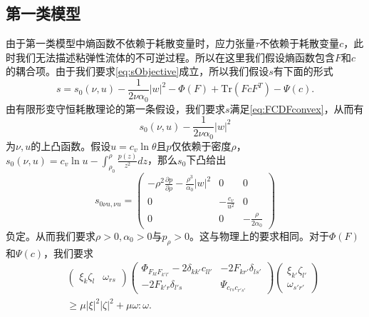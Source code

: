 \documentclass{article}
\begin{document}
\subsection{第一类模型}
由于第一类模型中熵函数不依赖于耗散变量时，应力张量$\tau$不依赖于耗散变量$c$，此时我们无法描述粘弹性流体的不可逆过程。所以在这里我们假设熵函数包含$F$和$c$的耦合项。由于我们要求\eqref{eq:sObjective}成立，所以我们假设$s$有下面的形式 
 $$s = s_0(\nu,u) - \frac{1}{2 \nu \alpha_0} |w|^2 - \Phi (F) + \mbox{Tr} (FcF^T) - \Psi(c) .$$
由有限形变守恒耗散理论的第一条假设，我们要求$s$满足\eqref{eq:FCDFconvex}，从而有
\begin{equation*}
	s_0(\nu,u) - \frac{1}{2\nu \alpha_0}|w|^2
\end{equation*}
为$\nu,u$的上凸函数。假设$u = c_v \ln \theta$且$p$仅依赖于密度$\rho$，$s_0(\nu,u) = c_v \ln u - \int_{\rho_0}^\rho \frac{p(z)}{z^2}dz$，那么$s_0$下凸给出
\begin{equation*}
	s_{0\nu u,\nu u} = \left( \begin{array}{ccc}
		- \rho^2 \frac{\partial p}{\partial \rho} - \frac{\rho^3}{\alpha_0}|w|^2 & 0 & 0 \\
		0 & -\frac{c_v}{u^2} & 0 \\
		0 & 0 & -\frac{\rho}{2\alpha_0}
	\end{array}\right)
\end{equation*}
负定。从而我们要求$\rho>0,\alpha_0>0$与$p_\rho>0$。这与物理上的要求相同。对于$\Phi(F)$和$\Psi(c)$，我们要求
\begin{eqnarray*}
	&&\left( \begin{array}{cc}
		\xi_k \zeta_l & \omega_{rs} 
	\end{array}\right)
	\left( \begin{array}{cc}
		\Phi_{F_{kl}F_{k'l'}} - 2\delta_{kk'} c_{ll'}& -2 F_{kr'} \delta_{ls'} \\
		-2 F_{k'r} \delta_{l's} & \Psi_{c_{rs}c_{r's'}}
	\end{array}\right) 
	\left( \begin{array}{c}
		\xi_{k'}  \zeta_{l'} \\ \omega_{s'r'} 
	\end{array}\right) \\
	&&\ge \mu |\xi|^2|\zeta|^2 + \mu \omega:\omega.
\end{eqnarray*}
\end{document}
